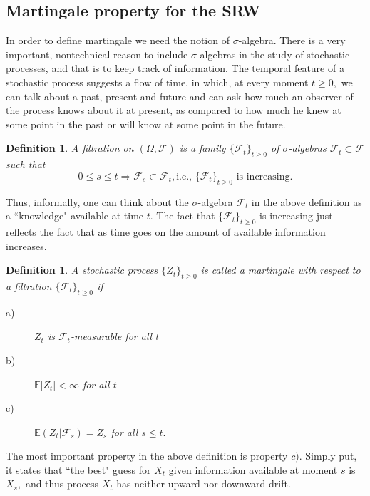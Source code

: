 \documentclass[reqno,psamsfonts, 10pt]{amsart}
\newtheorem{definition}[thm]{Definition}
\theoremstyle{remark}
\begin{document}
\subsection*{Martingale property for the SRW}


In order to define martingale we need the notion of
$\sigma$-algebra. There is a very important, nontechnical
reason to include $\sigma$-algebras in the study of
stochastic processes, and that is to keep track of
information. The temporal feature of a stochastic process
suggests a flow of time, in which, at every moment $t \ge
0,$ we can talk about a past, present and future and can
ask how much an observer of the process knows about it at
present, as compared to how much he knew at some point in
the past or will know at some point in the future.
\begin{definition} A filtration on $(\Omega, \mathcal{F})$
is a family $\{\mathcal{F}_t\}_{t \ge 0}$ of
$\sigma$-algebras $\mathcal{F}_t \subset \mathcal{F}$ such
that
$$
0 \le s \le t \Longrightarrow \mathcal{F}_s \subset
\mathcal{F}_t, \mbox{i.e., } \{\mathcal{F}_t\}_{t \ge 0}
\mbox{ is increasing}.
$$
\end{definition}
Thus, informally, one can think about the $\sigma$-algebra
$\mathcal{F}_t$ in the above definition as a ``knowledge"
available at time $t.$ The fact that $\{\mathcal{F}_t\}_{t
\ge 0}$ is increasing just reflects the fact that as time
goes on the amount of available information increases.


\begin{definition}
A stochastic process $\{Z_t\}_{t \ge 0}$ is called a
martingale with respect to a filtration
$\{\mathcal{F}_t\}_{t \ge 0} $ if
\begin{description}
\item[a)] $Z_t$ is $\mathcal{F}_t$-measurable for all
$t$

\item[b)] $\mathbb{E}|Z_t| < \infty$ for all $t$

\item[c)] $\mathbb{E}(Z_t | \mathcal{F}_s) = Z_s$ for all
$s \le t.$
\end{description}
\end{definition}

The most important property in the above definition is property
$c).$ Simply put, it states that ``the best" guess for $X_t$ given
information available at moment $s$ is~$X_s,$ and thus process
$X_t$ has neither upward nor downward drift.
\end{document}
